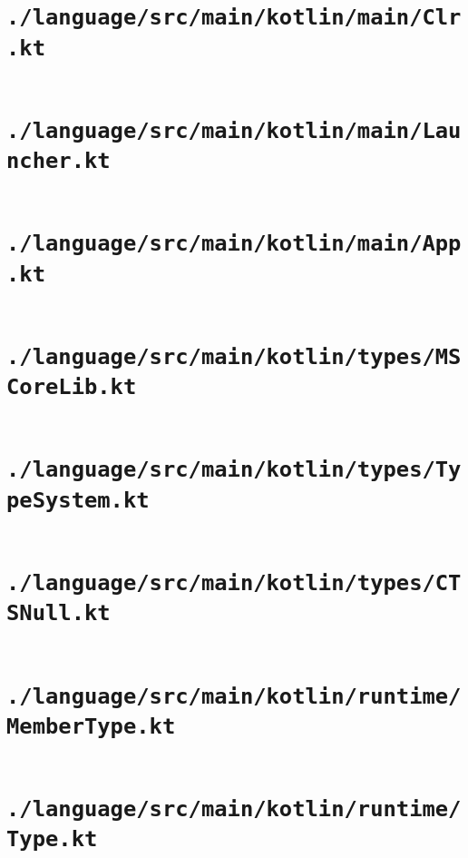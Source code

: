 \documentclass[a4paper, 11pt]{report}
\begin{document}
    \section{\lstinline{./language/src/main/kotlin/main/Clr.kt}}
    \inputminted{kotlin}{./language/src/main/kotlin/main/Clr.kt}


    \section{\lstinline{./language/src/main/kotlin/main/Launcher.kt}}
    \inputminted{kotlin}{./language/src/main/kotlin/main/Launcher.kt}


    \section{\lstinline{./language/src/main/kotlin/main/App.kt}}
    \inputminted{kotlin}{./language/src/main/kotlin/main/App.kt}


    \section{\lstinline{./language/src/main/kotlin/types/MSCoreLib.kt}}
    \inputminted{kotlin}{./language/src/main/kotlin/types/MSCoreLib.kt}


    \section{\lstinline{./language/src/main/kotlin/types/TypeSystem.kt}}
    \inputminted{kotlin}{./language/src/main/kotlin/types/TypeSystem.kt}


    \section{\lstinline{./language/src/main/kotlin/types/CTSNull.kt}}
    \inputminted{kotlin}{./language/src/main/kotlin/types/CTSNull.kt}


    \section{\lstinline{./language/src/main/kotlin/runtime/MemberType.kt}}
    \inputminted{kotlin}{./language/src/main/kotlin/runtime/MemberType.kt}


    \section{\lstinline{./language/src/main/kotlin/runtime/Type.kt}}
    \inputminted{kotlin}{./language/src/main/kotlin/runtime/Type.kt}
\end{document}
